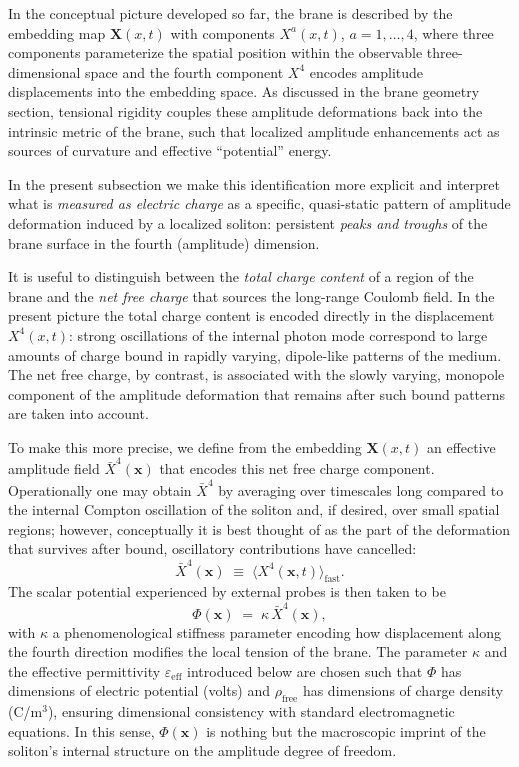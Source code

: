 In the conceptual picture developed so far, the brane is described by the
embedding map $\mathbf{X}(x,t)$ with components $X^a(x,t)$, $a=1,\dots,4$, where three components
parameterize the spatial position within the observable three-dimensional
space and the fourth component $X^4$ encodes amplitude displacements into the
embedding space. As discussed in the brane geometry section, tensional
rigidity couples these amplitude deformations back into the intrinsic
metric of the brane, such that localized amplitude enhancements act as
sources of curvature and effective ``potential'' energy.

In the present subsection we make this identification more explicit and
interpret what is \emph{measured as electric charge} as a specific,
quasi-static pattern of amplitude deformation induced by a localized
soliton: persistent \emph{peaks and troughs} of the brane surface in the
fourth (amplitude) dimension.

It is useful to distinguish between the \emph{total charge content} of a
region of the brane and the \emph{net free charge} that sources the
long-range Coulomb field. In the present picture the total charge
content is encoded directly in the displacement $X^4(x,t)$: strong
oscillations of the internal photon mode correspond to large amounts of
charge bound in rapidly varying, dipole-like patterns of the medium.
The net free charge, by contrast, is associated with the slowly varying,
monopole component of the amplitude deformation that remains after such
bound patterns are taken into account.

To make this more precise, we define from the embedding $\mathbf{X}(x,t)$
an effective amplitude field $\bar{X}^4(\mathbf{x})$ that encodes this
net free charge component. Operationally one may obtain $\bar{X}^4$ by
averaging over timescales long compared to the internal Compton
oscillation of the soliton and, if desired, over small spatial regions;
however, conceptually it is best thought of as the part of the
deformation that survives after bound, oscillatory contributions have
cancelled:
\begin{equation}
  \bar{X}^4(\mathbf{x})
  \;\equiv\;
  \big\langle X^4(\mathbf{x},t) \big\rangle_{\text{fast}}.
\end{equation}
The scalar potential experienced by external probes is then
taken to be
\begin{equation}
  \Phi(\mathbf{x})
  \;=\;
  \kappa\,\bar{X}^4(\mathbf{x}),
  \label{eq:phi-from-xi4}
\end{equation}
with $\kappa$ a phenomenological stiffness parameter encoding how
displacement along the fourth direction modifies the local tension of
the brane. The parameter $\kappa$ and the effective permittivity
$\varepsilon_{\mathrm{eff}}$ introduced below are chosen such that
$\Phi$ has dimensions of electric potential (volts) and $\rho_{\text{free}}$
has dimensions of charge density (C/m$^3$), ensuring dimensional consistency
with standard electromagnetic equations. In this sense, $\Phi(\mathbf{x})$
is nothing but the macroscopic imprint of the soliton's internal structure
on the amplitude degree of freedom.

